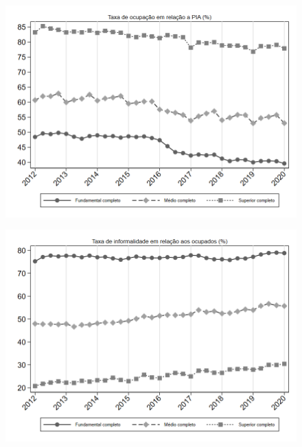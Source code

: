 \begin{frame}[label=_composicao_demografica_educacao_taxa_de_ocupacao]{}
\textit{\hyperlink{_composicao_demografica_educacao}{}}
\begin{figure}
  \centering
  \includegraphics[width=1\linewidth]{../../analysis/output/composicao_demografica/educacao/_composicao_demografica_educacao_taxa_de_ocupacao.png}
  \caption{}
  \label{fig:_composicao_demografica_educacao_taxa_de_ocupacao}
\end{figure}
\end{frame}

\begin{frame}[label=_composicao_demografica_educacao_taxa_de_informalidade]{}
\textit{\hyperlink{_composicao_demografica_educacao}{}}
\begin{figure}
  \centering
  \includegraphics[width=1.0\linewidth]{../../analysis/output/composicao_demografica/educacao/_composicao_demografica_educacao_taxa_de_informalidade.png}
  \caption{}
  \label{fig:_composicao_demografica_educacao_taxa_de_informalidade}
\end{figure}
\end{frame}

